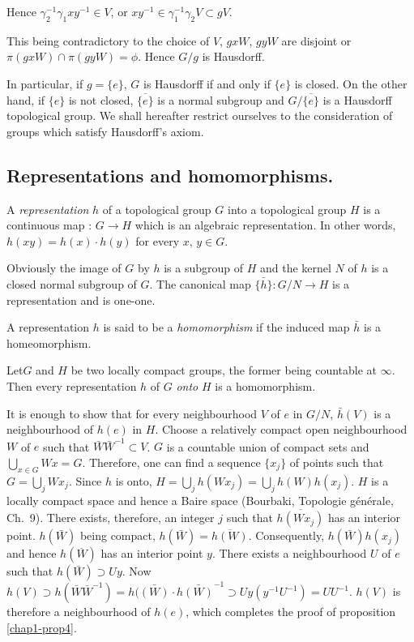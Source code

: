 Hence $\gamma^{-1}_2 \gamma_1 x y^{-1} \in V$,  or $x
y^{-1}\in \gamma^{-1}_1 \gamma_2 V \subset g V$. 

This being contradictory to the choice of $V$, $g x W$, $g y W$ are
disjoint or $\pi (g x W)\cap \pi (g y W)= \phi$. Hence $G/g$ is
Hausdorff. 

In particular, if $g=\{e\}$, $G$ is Hausdorff if and only if $\{e\}$ is
closed. On the other hand, if $\{e\}$ is not closed, $\overline{\{e\}}$
is a normal subgroup and $G/\overline{\{e\}}$ is a Hausdorff
topological group. We shall hereafter restrict ourselves to the
consideration of groups which satisfy Hausdorff's axiom. 

\subsection{Representations and
  homomorphisms.}\label{chap1-sec1.5}%

\begin{defi*} %
A {\em representation} $h$ of a topological group $G$ into a
topological group $H$ is a continuous map : $G \to H$ which is an
algebraic representation. In other words, $h(xy)= h(x)\cdot h(y)$ for
every $x$, $y \in G$. 
\end{defi*}

Obviously the image of $G$ by $h$ is a subgroup of $H$ and the kernel
$N$ of $h$ is a closed normal subgroup of $G$. The canonical map
$\bar{\{h\}}:G/N \to H$ is a representation and is one-one. 

\begin{defi*}%
A representation $h$ is said to be a {\em homomorphism} if the induced
map $\bar{h}$ is a homeomorphism.
\end{defi*}

\begin{proposition}\label{chap1-prop4}%
Let\pageoriginale $G$ and $H$ be two locally compact groups, the former being
 countable at $\infty$. Then every representation $h$ of $G$ {\em
   onto} $H$ is a homomorphism. 
\end{proposition}

It is enough to show that for every neighbourhood $V$ of $e$ in $G/N$,
$\bar{h}(V)$ is a neighbourhood of $h(e)$ in $H$. Choose a
relatively compact open neighbourhood $W$ of $e$ such that
$\bar{W} \bar{W}^{-1}\subset V$. $G$ is a countable union of
compact sets and $\bigcup_{x \in G} W x = G$. Therefore, one
can find a sequence $\{x_j\}$ of points such that $G =
\bigcup_{j}  W x_j$. Since $h$ is onto, $H = \bigcup_{j}
h (W x_j)= \bigcup_{j} h(W)h(x_j)$. $H$ is a locally compact
space and hence a Baire space (Bourbaki, Topologie g\'en\'erale,
Ch.~9). There exists, therefore, an integer $j$ such that
$\overline{h(Wx_j)}$ has an interior point. $h(\bar{W})$ being
compact, $h(\bar{W})=\overline{h(W)}$. Consequently,
$h(\bar{W})h(x_j)$ and hence $h(\overline{W})$ has an interior
point $y$. There exists a neighbourhood $U$ of $e$ such that
$h(\bar{W})\supset Uy$. Now $h(V)\supset h(\bar{W}
\bar{W}^{-1}) = h(\bar{(W)}\cdot h \bar{(W)}^{-1}
\supset Uy(y^{-1}U^{-1})=UU^{-1}$. $h(V)$ is therefore a neighbourhood
of $h(e)$, which completes the proof of proposition \ref{chap1-prop4}. 
